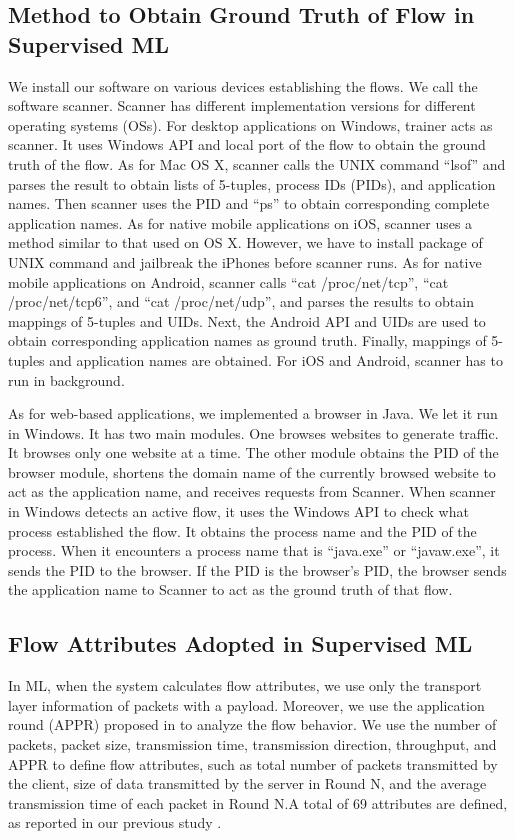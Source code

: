\documentclass[journal]{IEEEtran}
\begin{document}
\subsection{Method to Obtain Ground Truth of Flow in Supervised ML}
We install our software on various devices establishing the flows. We call the software scanner. Scanner has different implementation versions for different operating systems (OSs). For desktop applications on Windows, trainer acts as scanner. It uses Windows API and local port of the flow to obtain the ground truth of the flow. As for Mac OS X, scanner calls the UNIX command ``lsof'' and parses the result to obtain lists of 5-tuples, process IDs (PIDs), and application names. Then scanner uses the PID and ``ps'' to obtain corresponding complete application names. As for native mobile applications on iOS, scanner uses a method similar to that used on OS X. However, we have to install package of UNIX command and jailbreak the iPhones before scanner runs.  As for native mobile applications on Android, scanner calls ``cat /proc/net/tcp'', ``cat /proc/net/tcp6'', and ``cat /proc/net/udp'', and parses the results to obtain mappings of 5-tuples and UIDs. Next, the Android API and UIDs are used to obtain corresponding application names as ground truth. Finally, mappings of 5-tuples and application names are obtained. For iOS and Android, scanner has to run in background.

As for web-based applications, we implemented a browser in Java. We let it run in Windows. It has two main modules. One browses websites to generate traffic. It browses only one website at a time. The other module obtains the PID of the browser module, shortens the domain name of the currently browsed website to act as the application name, and receives requests from Scanner. When scanner in Windows detects an active flow, it uses the Windows API to check what process established the flow. It obtains the process name and the PID of the process. When it encounters a process name that is ``java.exe'' or ``javaw.exe'', it sends the PID to the browser. If the PID is the browser’s PID, the browser sends the application name to Scanner to act as the ground truth of that flow.

\subsection{Flow Attributes Adopted in Supervised ML}
In ML, when the system calculates flow attributes, we use only the transport layer information of packets with a payload. Moreover, we use the application round (APPR) proposed in \cite{classfication-cloud} to analyze the flow behavior. We use the number of packets, packet size, transmission time, transmission direction, throughput, and APPR to define flow attributes, such as total number of packets transmitted by the client, size of data transmitted by the server in Round N, and the average transmission time of each packet in Round N.A total of 69 attributes are defined, as reported in our previous study \cite{Chia-Chin-master}.
\end{document}

